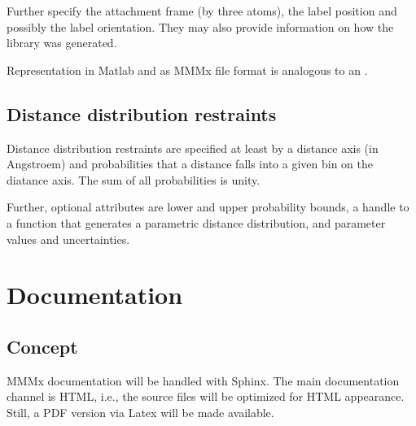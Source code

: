 \documentclass[letterpaper,10pt,english]{sphinxmanual}
\begin{document}
Further  specify the attachment frame (by three atoms), the label position and possibly the label orientation. They may also provide information on how the library was generated.

Representation in Matlab and as MMMx file format is analogous to an .


\section{Distance distribution restraints}
\label{\detokenize{data:distance-distribution-restraints}}
Distance distribution restraints are specified at least by a distance axis (in Angstroem) and probabilities that a distance falls into a given bin on the diatance axis. The sum of all probabilities is unity.

Further, optional attributes are lower and upper probability bounds, a handle to a function that generates a parametric distance distribution, and parameter values and uncertainties.


\chapter{Documentation}
\label{\detokenize{docs:documentation}}\label{\detokenize{docs::doc}}

\section{Concept}
\label{\detokenize{docs:concept}}
MMMx documentation will be handled with Sphinx. The main documentation channel is HTML, i.e., the  source files will be optimized for HTML appearance.
Still, a PDF version via Latex will be made available.
\end{document}
